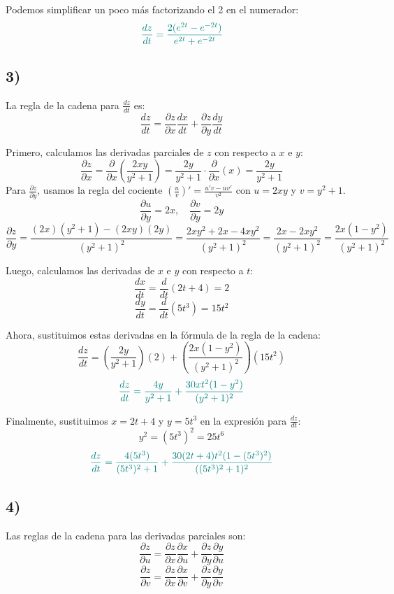 \documentclass{article}
\begin{document}
Podemos simplificar un poco más factorizando el 2 en el numerador:
\[ \color{teal}
\frac{dz}{dt} = \frac{2(e^{2t} - e^{-2t})}{e^{2t} + e^{-2t}}
\]

\subsection*{3)}
La regla de la cadena para $\frac{dz}{dt}$ es:
\[
\frac{dz}{dt} = \frac{\partial z}{\partial x} \frac{dx}{dt} + \frac{\partial z}{\partial y} \frac{dy}{dt}
\]

Primero, calculamos las derivadas parciales de $z$ con respecto a $x$ e $y$:
\[
\frac{\partial z}{\partial x} = \frac{\partial}{\partial x} \left( \frac{2xy}{y^2 + 1} \right) = \frac{2y}{y^2 + 1} \cdot \frac{\partial}{\partial x}(x) = \frac{2y}{y^2 + 1}
\]
Para $\frac{\partial z}{\partial y}$, usamos la regla del cociente $\left(\frac{u}{v}\right)' = \frac{u'v - uv'}{v^2}$ con $u = 2xy$ y $v = y^2 + 1$.
\[
\frac{\partial u}{\partial y} = 2x, \quad \frac{\partial v}{\partial y} = 2y
\]
\[
\frac{\partial z}{\partial y} = \frac{(2x)(y^2 + 1) - (2xy)(2y)}{(y^2 + 1)^2} = \frac{2xy^2 + 2x - 4xy^2}{(y^2 + 1)^2} = \frac{2x - 2xy^2}{(y^2 + 1)^2} = \frac{2x(1 - y^2)}{(y^2 + 1)^2}
\]

Luego, calculamos las derivadas de $x$ e $y$ con respecto a $t$:
\[
\frac{dx}{dt} = \frac{d}{dt}(2t + 4) = 2
\]
\[
\frac{dy}{dt} = \frac{d}{dt}(5t^3) = 15t^2
\]

Ahora, sustituimos estas derivadas en la fórmula de la regla de la cadena:
\[
\frac{dz}{dt} = \left( \frac{2y}{y^2 + 1} \right) (2) + \left( \frac{2x(1 - y^2)}{(y^2 + 1)^2} \right) (15t^2)
\]
\[ \color{teal}
\frac{dz}{dt} = \frac{4y}{y^2 + 1} + \frac{30xt^2(1 - y^2)}{(y^2 + 1)^2}
\]

Finalmente, sustituimos $x = 2t + 4$ y $y = 5t^3$ en la expresión para $\frac{dz}{dt}$:
\[
y^2 = (5t^3)^2 = 25t^6
\]
\[ \color{teal}
\frac{dz}{dt} = \frac{4(5t^3)}{(5t^3)^2 + 1} + \frac{30(2t + 4)t^2(1 - (5t^3)^2)}{((5t^3)^2 + 1)^2}
\]


\subsection*{4)}
Las reglas de la cadena para las derivadas parciales son:
\[
\frac{\partial z}{\partial u} = \frac{\partial z}{\partial x} \frac{\partial x}{\partial u} + \frac{\partial z}{\partial y} \frac{\partial y}{\partial u}
\]
\[
\frac{\partial z}{\partial v} = \frac{\partial z}{\partial x} \frac{\partial x}{\partial v} + \frac{\partial z}{\partial y} \frac{\partial y}{\partial v}
\]
\end{document}

